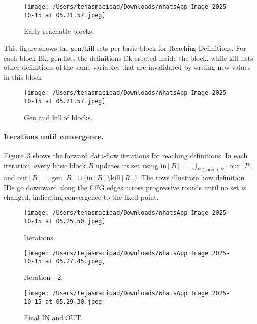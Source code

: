 \documentclass[12pt, a4paper]{report}
\begin{document}
\begin{figure}[H]
\centering
\texttt{[image: /Users/tejasmacipad/Downloads/WhatsApp Image 2025-10-15 at 05.21.57.jpeg]}
\caption{Early reachable blocks.}
\label{fig:diff-example-66}
\end{figure}

\noindent This figure shows the gen/kill sets per basic block for Reaching Definitions. For each block Bk, gen lists the definitions Dk created inside the block, while kill lists other definitions of the same variables that are invalidated by writing new values in this block

\begin{figure}[H]
\centering
\texttt{[image: /Users/tejasmacipad/Downloads/WhatsApp Image 2025-10-15 at 05.21.57.jpeg]}
\caption{Gen and kill of blocks.}
\label{fig:diff-example-67}
\end{figure}

\paragraph{Iterations until convergence.}\vspace{0.25\baselineskip}

\noindent
Figure~\ref{fig:diff-example-68} shows the forward data-flow iterations for reaching definitions. 
In each iteration, every basic block \(B\) updates its set using
\( \mathrm{in}[B] = \bigcup_{P \in \mathrm{pred}(B)} \mathrm{out}[P] \)
and
\( \mathrm{out}[B] = \mathrm{gen}[B] \cup \bigl(\mathrm{in}[B] \setminus \mathrm{kill}[B]\bigr) \).
The rows illustrate how definition IDs go downward along the CFG edges across progressive rounds until no set is changed, indicating convergence to the fixed point.

\begin{figure}[H]
\centering
\texttt{[image: /Users/tejasmacipad/Downloads/WhatsApp Image 2025-10-15 at 05.25.50.jpeg]}
\caption{Iterations.}
\label{fig:diff-example-68}
\end{figure}

\begin{figure}[H]
\centering
\texttt{[image: /Users/tejasmacipad/Downloads/WhatsApp Image 2025-10-15 at 05.27.45.jpeg]}
\caption{Iteration - 2.}
\label{fig:diff-example-69}
\end{figure}

\begin{figure}[H]
\centering
\texttt{[image: /Users/tejasmacipad/Downloads/WhatsApp Image 2025-10-15 at 05.29.30.jpeg]}
\caption{Final IN and OUT.}
\label{fig:diff-example-70}
\end{figure}
\end{document}

